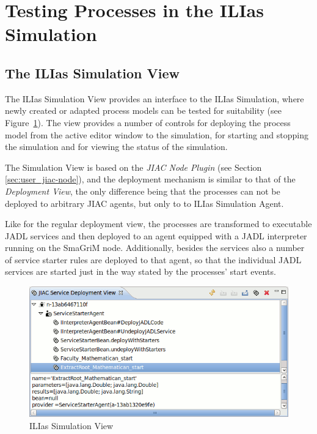 
\section{Testing Processes in the ILIas Simulation}


\subsection{The ILIas Simulation View}

The ILIas Simulation View provides an interface to the ILIas Simulation, where
newly created or adapted process models can be tested for suitability (see
Figure~\ref{fig:ilias-simview}).  The view provides a number of controls for
deploying the process model from the active editor window to the simulation, for
starting and stopping the simulation and for viewing the status of the simulation.

The Simulation View is based on the \emph{JIAC Node Plugin} (see Section
\ref{sec:user_jiac-node}), and the deployment mechanism is similar to that of the
\emph{Deployment View}, the only difference being that the processes can not be
deployed to arbitrary JIAC agents, but only to to ILIas Simulation Agent.

Like for the regular deployment view, the processes are transformed to executable
JADL services and then deployed to an agent equipped with a JADL interpreter
running on the SmaGriM node.  Additionally, besides the services also a number of
service starter rules are deployed to that agent, so that the individual JADL
services are started just in the way stated by the processes' start events.


\begin{figure}
	\centering
	\includegraphics[width=.6\textwidth]{figures/features/deployment-view.png}
	\caption{ILIas Simulation View}
	\label{fig:ilias-simview}
\end{figure}


